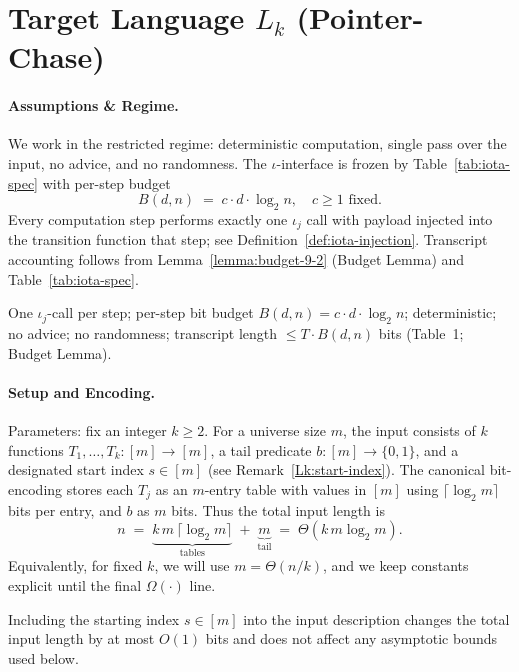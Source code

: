 
\section{Target Language \texorpdfstring{$L_k$}{Lk} (Pointer-Chase)}
\label{Lk:sec:Lk}

\paragraph{Assumptions \& Regime.}
We work in the restricted regime: deterministic computation, single pass over the input, no advice, and no randomness. The $\iota$-interface is frozen by Table~\ref{tab:iota-spec} with per-step budget
\[ B(d,n) \;=\; c \cdot d \cdot \log_{2} n, \quad c\ge 1 \text{ fixed.} \]
Every computation step performs exactly one $\iota_j$ call with payload injected into the transition function that step; see Definition~\ref{def:iota-injection}. Transcript accounting follows from Lemma~\ref{lemma:budget-9-2} (Budget Lemma) and Table~\ref{tab:iota-spec}.

\begin{tcolorbox}[title=Mini-Recap, colback=white]
One $\iota_j$-call per step; per-step bit budget $B(d,n)=c \cdot d \cdot \log_{2} n$; deterministic; no advice; no randomness; transcript length $\le T\cdot B(d,n)$ bits (Table~1; Budget Lemma).
\end{tcolorbox}

\paragraph{Setup and Encoding.}
Parameters: fix an integer $k\ge 2$. For a universe size $m$, the input consists of $k$ functions $T_1,\ldots,T_k : [m]\to[m]$, a tail predicate $b:[m]\to\{0,1\}$, and a designated start index $s\in[m]$ (see Remark~\ref{Lk:start-index}). The canonical bit-encoding stores each $T_j$ as an $m$-entry table with values in $[m]$ using $\lceil\log_{2} m\rceil$ bits per entry, and $b$ as $m$ bits. Thus the total input length is
\[
 n \;=\; \underbrace{k\,m\,\lceil\log_{2} m\rceil}_{\text{tables}} \; + \; \underbrace{m}_{\text{tail}} \;=\; \Theta(k\,m\log_{2} m).
\]
Equivalently, for fixed $k$, we will use $m = \Theta(n/k)$, and we keep constants explicit until the final $\Omega(\cdot)$ line.

\begin{remark}\label{Lk:start-index}
Including the starting index $s\in[m]$ into the input description changes the total input length by at most $O(1)$ bits and does not affect any asymptotic bounds used below.
\end{remark}


